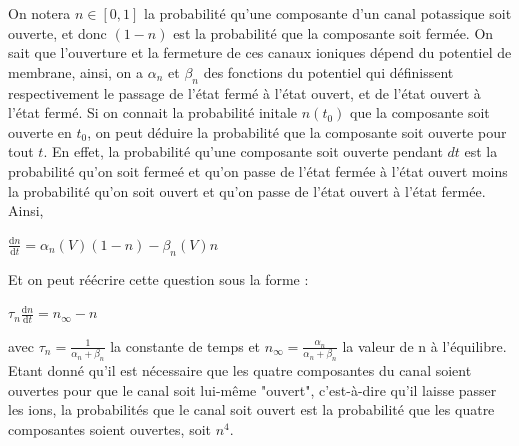 \documentclass[12pt]{scrartcl}
\newcommand{\dd}{\mathrm{d}}
\begin{document}
On notera $n \in [0, 1]$ la probabilité qu'une composante d'un canal potassique soit ouverte, et donc $(1-n)$ est la probabilité que la composante soit fermée. On sait que l'ouverture et la fermeture de ces canaux ioniques dépend du potentiel de membrane, ainsi, on a $\alpha_n$ et $\beta_n$ des fonctions du potentiel qui définissent respectivement le passage de l'état fermé  à l'état ouvert, et de l'état ouvert à l'état fermé. Si on connait la probabilité initale $n(t_0)$ que la composante soit ouverte en $t_0$, on peut déduire la probabilité que la composante soit ouverte pour tout $t$. En effet, la probabilité qu'une composante soit ouverte pendant $dt$ est la probabilité qu'on soit fermeé et qu'on passe de l'état fermée à l'état ouvert moins la probabilité qu'on soit ouvert et qu'on passe de l'état ouvert à l'état fermée. Ainsi, 
\begin{center} $\displaystyle \frac{\dd n}{\dd t} = \alpha_n(V)(1-n) - \beta_n(V) n$ \end{center}
Et on peut réécrire cette question sous la forme :
\begin{center} $\displaystyle \tau_n \frac{\dd n}{\dd t} = n_{\infty} - n$ \end{center}
avec $\tau_n = \frac{1}{\alpha_n+\beta_n}$ la constante de temps et $n_\infty = \frac{\alpha_n}{\alpha_n+\beta_n}$ la valeur de n à l'équilibre. \\
Etant donné qu'il est nécessaire que les quatre composantes du canal soient ouvertes pour que le canal soit lui-même "ouvert", c'est-à-dire qu'il laisse passer les ions, la probabilités que le canal soit ouvert est la probabilité que les quatre composantes soient ouvertes, soit $n^4$.
\end{document}
